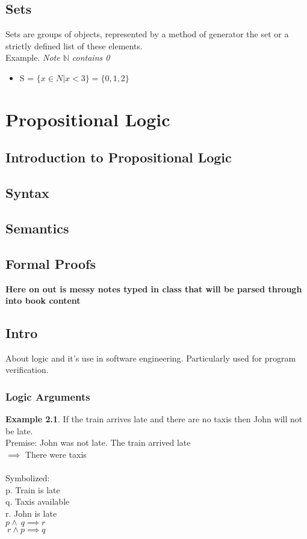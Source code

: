 \documentclass[12pt,oneside,notitlepage]{book}
\theoremstyle{definition}
\newtheorem{ex}{Example}[subsection]
\newcommand{\N}{\mb{N}}
\newcommand{\mb}[1]{\ensuremath{\mathbb{#1}}}
\begin{document}
\section{Sets}
Sets are groups of objects, represented by a method of generator the set or a strictly defined list of these elements. \\
Example. {\it Note $\N$ contains 0 }
\begin{itemize}
\item S = $\{ x\in N | x < 3 \} = \{0, 1, 2 \}$
\end{itemize}
\chapter{Propositional Logic}
\section{Introduction to Propositional Logic}
\section{Syntax}
\section{Semantics}
\section{Formal Proofs}

\newpage
{\bf Here on out is messy notes typed in class that will be parsed through into book content}
\section{Intro}
About logic and it's use in software engineering. Particularly used for program verification.

\subsection{Logic Arguments}
\begin{ex}
If the train arrives late and there are no taxis then John will not be late. \\
Premise: John was not late. The train arrived late \\
$\implies$ There were taxis \\ \\
Symbolized: \\
p. Train is late \\
q. Taxis available\\
r. John is late \\
$p \wedge ~q \implies r$ \\
$~r \wedge p \implies q$
\end{ex}
\end{document}
